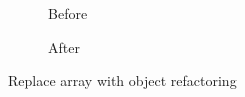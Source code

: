 \begin{figure}
  \label{refa:ReplaceArray}
  \begin{subfigure}[h]{.45\linewidth}
    
    \caption{Before}
  \end{subfigure}\hspace{1cm}
  \begin{subfigure}[h]{.45\linewidth}
    
    \caption{After}
  \end{subfigure}
  \caption{Replace array with object refactoring}
\end{figure}
